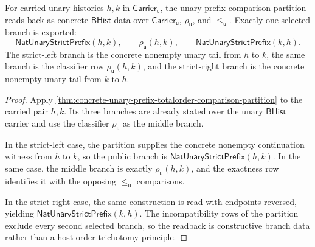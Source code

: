 \begin{theorem}
\label{thm:orderup-unary-prefix-constructive-trichotomy-readback}
For carried unary histories $h,k$ in $\mathsf{Carrier}_{\mathsf{u}}$, the
unary-prefix comparison partition reads back as concrete $\mathsf{BHist}$ data
over $\mathsf{Carrier}_{\mathsf{u}}$, $\rho_{\mathsf{u}}$, and
$\le_{\mathsf{u}}$. Exactly one selected branch is exported:
$$
\mathsf{NatUnaryStrictPrefix}(h,k),
\qquad
\rho_{\mathsf{u}}(h,k),
\qquad
\mathsf{NatUnaryStrictPrefix}(k,h).
$$
The strict-left branch is the concrete nonempty unary tail from $h$ to $k$, the
same branch is the classifier row $\rho_{\mathsf{u}}(h,k)$, and the
strict-right branch is the concrete nonempty unary tail from $k$ to $h$.
\end{theorem}
\begin{proof}
Apply \autoref{thm:concrete-unary-prefix-totalorder-comparison-partition} to the
carried pair $h,k$. Its three branches are already stated over the unary
$\mathsf{BHist}$ carrier and use the classifier $\rho_{\mathsf{u}}$ as the
middle branch.

In the strict-left case, the partition supplies the concrete nonempty
continuation witness from $h$ to $k$, so the public branch is
$\mathsf{NatUnaryStrictPrefix}(h,k)$. In the same case, the middle branch is
exactly $\rho_{\mathsf{u}}(h,k)$, and the exactness row identifies it with the
opposing $\le_{\mathsf{u}}$ comparisons.

In the strict-right case, the same construction is read with endpoints reversed,
yielding $\mathsf{NatUnaryStrictPrefix}(k,h)$. The incompatibility rows of the
partition exclude every second selected branch, so the readback is constructive
branch data rather than a host-order trichotomy principle.
\end{proof}


